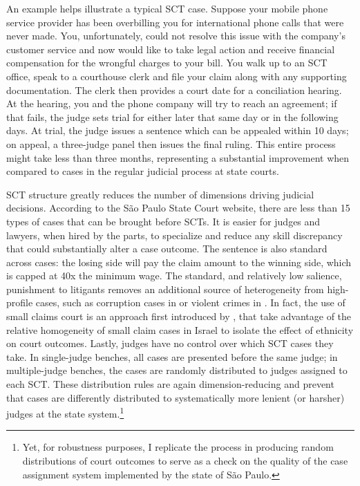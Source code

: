 \documentclass[11pt]{article}
\begin{document}
An example helps illustrate a typical SCT case. Suppose your mobile phone service provider has been overbilling you for international phone calls that were never made. You, unfortunately, could not resolve this issue with the company's customer service and now would like to take legal action and receive financial compensation for the wrongful charges to your bill. You walk up to an SCT office, speak to a courthouse clerk and file your claim along with any supporting documentation. The clerk then provides a court date for a conciliation hearing. At the hearing, you and the phone company will try to reach an agreement; if that fails, the judge sets trial for either later that same day or in the following days. At trial, the judge issues a sentence which can be appealed within 10 days; on appeal, a three-judge panel then issues the final ruling. This entire process might take less than three months, representing a substantial improvement when compared to cases in the regular judicial process at state courts.

SCT structure greatly reduces the number of dimensions driving judicial decisions. According to the São Paulo State Court website, there are less than 15 types of cases that can be brought before SCTs. It is easier for judges and lawyers, when hired by the parts, to specialize and reduce any skill discrepancy that could substantially alter a case outcome. The sentence is also standard across cases: the losing side will pay the claim amount to the winning side, which is capped at 40x the minimum wage. The standard, and relatively low salience, punishment to litigants removes an additional source of heterogeneity from high-profile cases, such as corruption cases in \citet{LambaisJudicialSubversionEvidence2018} or violent crimes in \citet{LimJudgePoliticianPress2015}. In fact, the use of small claims court is an approach first introduced by \citet{ShayoJudicialIngroupBias2011}, that take advantage of the relative homogeneity of small claim cases in Israel to isolate the effect of ethnicity on court outcomes. Lastly, judges have no control over which SCT cases they take. In single-judge benches, all cases are presented before the same judge; in multiple-judge benches, the cases are randomly distributed to judges assigned to each SCT. These distribution rules are again dimension-reducing and prevent that cases are differently distributed to systematically more lenient (or harsher) judges at the state system.\footnote{Yet, for robustness purposes, I replicate the process in \citet{AbramsJudgesVaryTheir2012} producing random distributions of court outcomes to serve as a check on the quality of the case assignment system implemented by the state of São Paulo.}
\end{document}
